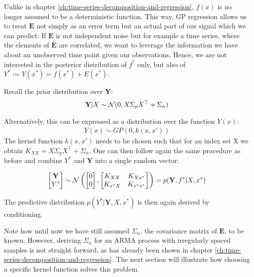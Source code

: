 Unlike in chapter \ref{ch:time-series-decomposition-and-regression}, $f(x)$ is no longer assumed to be a
deterministic function. This way, GP regression allows us to treat $\mathbf{E}$ not simply as an error term but an actual part of
our signal which we can predict. If $\mathbf{E}$ is not independent noise but for example a time series, where
the elements of $\mathbf{E}$ are correlated, we want to leverage the information we have about an unobserved
time point given our observations.
Hence, we are not interested in the posterior distribution of $f^{\ast}$ only, but also of
$Y^{\ast} := Y(x^{\ast}) = f(x^{\ast}) + E(x^{\ast})$.

Recall the prior distribution over $\mathbf{Y}$:
\begin{gather*}
    \mathbf{Y}|X \sim \operatorname{\mathcal{N}}(0,  X \Sigma_p X^{\top} + \Sigma_n) \\
\end{gather*}

Alternatively, this can be expressed as a distribution over the function $Y(x)$:
\begin{gather*}
    Y(x) \sim GP(0, k(x, x'))
\end{gather*}
The kernel function $k(x,x')$ needs to be chosen such that for an index set X we obtain $K_{XX} =  X \Sigma_p X^{\top} + \Sigma_n$.
One can then follow again the same procedure as before and combine $Y^{\ast}$ and $\mathbf{Y}$ into a single random vector:

\begin{gather}
    \begin{bmatrix}
        \mathbf{Y} \\
        Y^{\ast}
    \end{bmatrix}
    \sim \operatorname{\mathcal{N}} \left(
        \begin{bmatrix}
        0 \\
        0
        \end{bmatrix},
        \begin{bmatrix}
        K_{XX} & K_{Xx^{\ast}} \\
        K_{x^{\ast}X} & K_{x^{\ast}x^{\ast}}
        \end{bmatrix}
        \right)
    = p(\mathbf{Y}, f^{\ast}| X, x^{\ast})
\end{gather}

The predictive distribution $p(Y^{\ast} | \mathbf{Y}, X, x^{\ast})$ is then again derived by conditioning.

Note how until now we have still assumed $\Sigma_n$, the covariance matrix of $\mathbf{E}$, to be known.
However, deriving $\Sigma_n$ for an ARMA process with irregularly spaced samples is not straight forward, as has already
been shown in chapter \ref{ch:time-series-decomposition-and-regression}. The next section will illustrate how choosing a
specific kernel function solves this problem.

